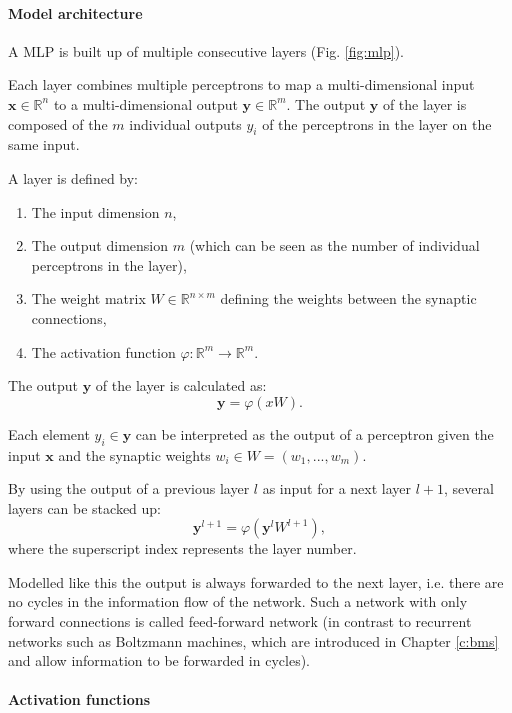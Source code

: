 \paragraph{Model architecture} \label{c:mlparch}

A MLP is built up of multiple consecutive layers (Fig. \ref{fig:mlp}).

Each layer combines multiple perceptrons to map a multi-dimensional input $\textbf{x} \in \mathbb{R}^n$ to a multi-dimensional output $\textbf{y} \in \mathbb{R}^m$.
The output $\textbf{y}$ of the layer is composed of the $m$ individual outputs $y_i$ of the perceptrons in the layer on the same input.


A layer is defined by:
\begin{enumerate}
	\item The input dimension $n$,
	\item The output dimension $m$ (which can be seen as the number of individual perceptrons in the layer),
	\item The weight matrix $W \in \mathbb{R}^{n\times m} $ defining the weights between the synaptic connections,
	\item The activation function $\varphi : \mathbb{R}^m \rightarrow \mathbb{R}^m $.
\end{enumerate}

The output $\textbf{y}$ of the layer is calculated as:
\[
\textbf{y} = \varphi(x W).
\]

Each element $y_i \in \textbf{y}$ can be interpreted as the output of a perceptron given the input $\textbf{x}$ and the synaptic weights $w_i \in W = (w_1, ... , w_m)$.

By using the output of a previous layer $l$ as input for a next layer $l+1$, several layers can be stacked up: 
\[
\textbf{y}^{l+1} = \varphi ( \textbf{y}^{l} W^{l+1} ) ,
\]
where the superscript index represents the layer number. 

Modelled like this the output is always forwarded to the next layer, i.e. there are no cycles in the information flow of the network.
Such a network with only forward connections is called feed-forward network (in contrast to recurrent networks such as Boltzmann machines, which are introduced in Chapter \ref{c:bms} and allow information to be forwarded in cycles).


\paragraph{Activation functions} \label{c:mlpact}

